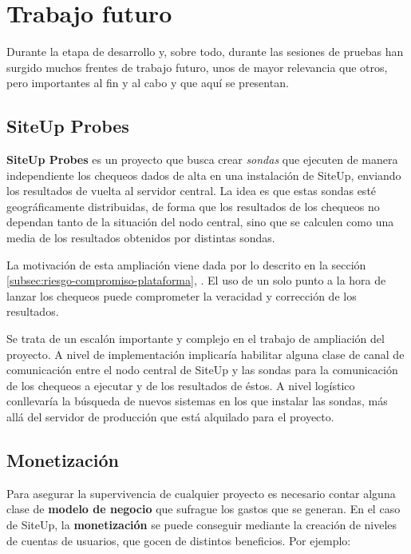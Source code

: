 \section{Trabajo futuro}

Durante la etapa de desarrollo y, sobre todo, durante las sesiones de pruebas
han surgido muchos frentes de trabajo futuro, unos de mayor relevancia que
otros, pero importantes al fin y al cabo y que aquí se presentan.

\subsection{SiteUp Probes}

\textbf{SiteUp Probes} es un proyecto que busca crear \textit{sondas} que
ejecuten de manera independiente los chequeos dados de alta en una instalación
de SiteUp, enviando los resultados de vuelta al servidor central. La idea es que
estas sondas esté geográficamente distribuidas, de forma que los resultados de
los chequeos no dependan tanto de la situación del nodo central, sino que se
calculen como una media de los resultados obtenidos por distintas sondas.

La motivación de esta ampliación viene dada por lo descrito en la sección
\ref{subsec:riesgo-compromiso-plataforma},
\textit{}. El uso de un solo punto
a la hora de lanzar los chequeos puede comprometer la veracidad y corrección de
los resultados.

Se trata de un escalón importante y complejo en el trabajo de ampliación del
proyecto. A nivel de implementación implicaría habilitar alguna clase de canal
de comunicación entre el nodo central de SiteUp y las sondas para la
comunicación de los chequeos a ejecutar y de los resultados de éstos. A nivel
logístico conllevaría la búsqueda de nuevos sistemas en los que instalar las
sondas, más allá del servidor de producción que está alquilado para el proyecto.

\subsection{Monetización}

Para asegurar la supervivencia de cualquier proyecto es necesario contar alguna
clase de \textbf{modelo de negocio} que sufrague los gastos que se generan. En
el caso de SiteUp, la \textbf{monetización} se puede conseguir mediante la
creación de niveles de cuentas de usuarios, que gocen de distintos
beneficios. Por ejemplo:

